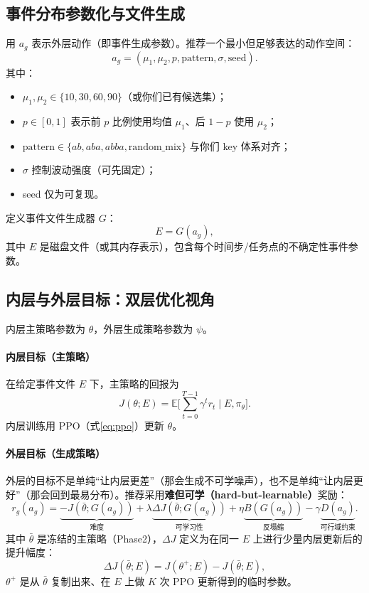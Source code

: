 \documentclass[UTF8,11pt,a4paper]{ctexart}
\begin{document}
\subsection{事件分布参数化与文件生成}
用 $a_g$ 表示外层动作（即事件生成参数）。推荐一个最小但足够表达的动作空间：
\begin{equation}
\label{eq:ag}
 a_g=(\mu_1,\mu_2,p,\text{pattern},\sigma,\text{seed}).
\end{equation}
其中：
\begin{itemize}
\item $\mu_1,\mu_2\in\{10,30,60,90\}$（或你们已有候选集）；
\item $p\in[0,1]$ 表示前 $p$ 比例使用均值 $\mu_1$、后 $1-p$ 使用 $\mu_2$；
\item $\text{pattern}\in\{ab,aba,abba,\text{random\_mix}\}$ 与你们 key 体系对齐；
\item $\sigma$ 控制波动强度（可先固定）；
\item seed 仅为可复现。
\end{itemize}

定义事件文件生成器 $G$：
\begin{equation}
 E=G(a_g),
\end{equation}
其中 $E$ 是磁盘文件（或其内存表示），包含每个时间步/任务点的不确定性事件参数。

\subsection{内层与外层目标：双层优化视角}
内层主策略参数为 $\theta$，外层生成策略参数为 $\psi$。

\paragraph{内层目标（主策略）}
在给定事件文件 $E$ 下，主策略的回报为
\begin{equation}
 J(\theta;E)=\mathbb{E}\Big[\sum_{t=0}^{T-1}\gamma^t r_t\;\big|\;E,\pi_\theta\Big].
\end{equation}
内层训练用 PPO（式\eqref{eq:ppo}）更新 $\theta$。

\paragraph{外层目标（生成策略）}
外层的目标不是单纯``让内层更差''（那会生成不可学噪声），也不是单纯``让内层更好''（那会回到最易分布）。推荐采用\textbf{难但可学（hard-but-learnable）}奖励：
\begin{equation}
\label{eq:rg}
 r_g(a_g)=\underbrace{-J(\bar\theta;G(a_g))}_{\text{难度}}+\lambda\underbrace{\Delta J(\bar\theta;G(a_g))}_{\text{可学习性}}+\eta\underbrace{B(G(a_g))}_{\text{反塌缩}}-\gamma\underbrace{D(a_g)}_{\text{可行域约束}}.
\end{equation}
其中 $\bar\theta$ 是冻结的主策略（Phase2），\;$\Delta J$ 定义为在同一 $E$ 上进行少量内层更新后的提升幅度：
\begin{equation}
\Delta J(\bar\theta;E)=J(\theta^+;E)-J(\bar\theta;E),
\end{equation}
$\theta^+$ 是从 $\bar\theta$ 复制出来、在 $E$ 上做 $K$ 次 PPO 更新得到的临时参数。
\end{document}
